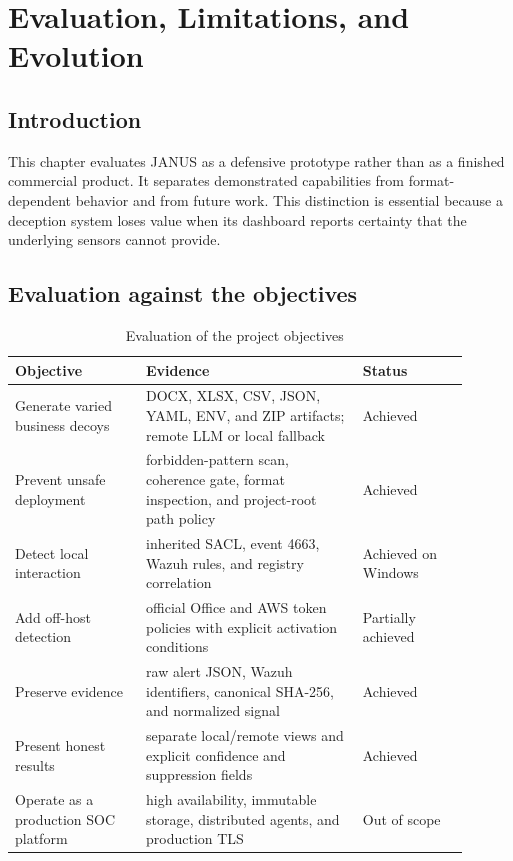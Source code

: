 \chapter{Evaluation, Limitations, and Evolution}

\section{Introduction}

This chapter evaluates JANUS as a defensive prototype rather than as a
finished commercial product. It separates demonstrated capabilities from
format-dependent behavior and from future work. This distinction is essential
because a deception system loses value when its dashboard reports certainty
that the underlying sensors cannot provide.

\section{Evaluation against the objectives}

\begin{table}[H]
\centering
\caption{Evaluation of the project objectives}
\label{tab:objective-evaluation}
\small
\begin{tabular}{p{0.26\linewidth}p{0.43\linewidth}p{0.21\linewidth}}
\toprule
Objective & Evidence & Status \\
\midrule
Generate varied business decoys & DOCX, XLSX, CSV, JSON, YAML, ENV, and ZIP
artifacts; remote LLM or local fallback & Achieved \\
Prevent unsafe deployment & forbidden-pattern scan, coherence gate,
format inspection, and project-root path policy & Achieved \\
Detect local interaction & inherited SACL, event 4663, Wazuh rules, and
registry correlation & Achieved on Windows \\
Add off-host detection & official Office and AWS token policies with explicit
activation conditions & Partially achieved \\
Preserve evidence & raw alert JSON, Wazuh identifiers, canonical SHA-256, and
normalized signal & Achieved \\
Present honest results & separate local/remote views and explicit confidence
and suppression fields & Achieved \\
Operate as a production SOC platform & high availability, immutable storage,
distributed agents, and production TLS & Out of scope \\
\bottomrule
\end{tabular}
\end{table}

